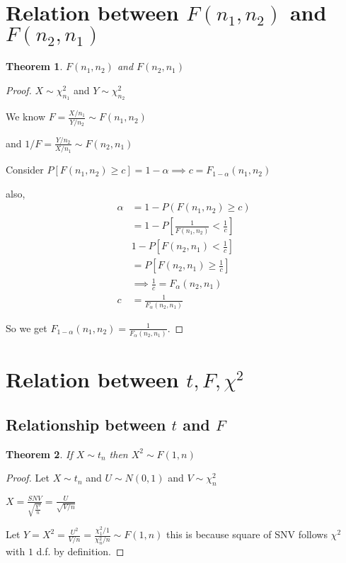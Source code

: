 \documentclass[oneside,11pt,pdftex]{book}%
\numberwithin{equation}{section}
\newtheorem{theorem}{Theorem}[chapter]%
\numberwithin{section}{chapter}
\numberwithin{equation}{chapter}
\begin{document}
\section{Relation between $ F(n_1,n_2) $ and $ F(n_2,n_1) $}
\begin{theorem}
	$ F(n_1,n_2) $ and $ F(n_2,n_1) $
\end{theorem}
\begin{proof}
	$ X \sim \chi^2_{n_1}$ and $ Y \sim \chi^2_{n_2} $
	
	We know $ F=\frac{X/n_1}{Y/n_2}\sim F(n_1,n_2) $
	
	and $ 1/F=\frac{Y/n_2}{X/n_1} \sim F(n_2,n_1) $
	
	Consider $ P[F(n_1,n_2)\geq c]=1-\alpha \implies c=F_{1-\alpha}(n_1,n_2)$
	
	also, 
	\begin{align*}
		\alpha &= 1- P(F(n_1,n_2)\geq c)\\
		&=1-P\left[\frac{1}{F(n_1,n_2)}<\frac{1}{c}\right]\\
		&1-P\left[F(n_2,n_1)<\frac{1}{c}\right]\\
		&=P\left[F(n_2,n_1)\geq \frac{1}{c}\right]\\
		&\implies \frac{1}{c}=F_\alpha (n_2,n_1)\\
		c&=\frac{1}{F_\alpha (n_2,n_1)}
	\end{align*}

So we get $ F_{1-\alpha}(n_1,n_2)=\frac{1}{F_\alpha (n_2,n_1)} $.
\end{proof}

\section{Relation between $ t, F, \chi^2 $}
\subsection{Relationship between $ t $ and $ F $}
\begin{theorem}
	If $ X\sim t_{n} $ then $ X^2 \sim F(1,n) $
\end{theorem}
\begin{proof}
	Let $ X \sim t_n $ and $ U \sim N(0,1) $ and $ V \sim \chi^2_n $
	
	$ X=\frac{SNV}{\sqrt{\frac{\chi^2}{n}}} =\frac{U}{\sqrt{V/n}}$
	
	Let $ Y=X^2=\frac{U^2}{V/n}=\frac{\chi_1^2/1}{\chi_n^2/n}\sim F(1,n) $ this is because square of SNV follows $ \chi^2  $ with $ 1$ d.f. by definition.
\end{proof}
\end{document}
